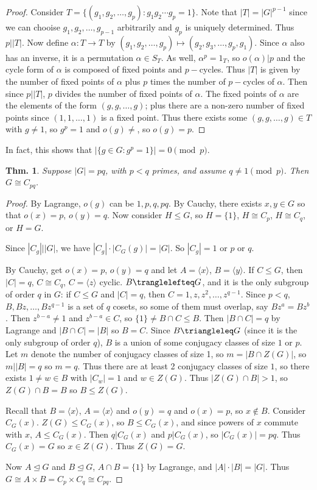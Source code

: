 \documentclass[12pt, a4paper]{book}
\newtheorem{theorem}{Thm.}[section]
\theoremstyle{nonumberplain}
\newtheorem{proof}{Proof}
\begin{document}
\begin{proof}
    Consider $T=\{(g_1,g_2,\ldots,g_p):g_1g_2\cdots g_p=1\}$.
    Note that $|T|=|G|^{p-1}$ since we can chooise $g_1,g_2,\ldots,g_{p-1}$ arbitrarily and $g_p$ is uniquely determined.
    Thus $p||T|$.
    Now define $\alpha:T\to T$ by $(g_1,g_2,\ldots,g_p)\mapsto(g_2,g_3,\ldots,g_p,g_1)$.
    Since $\alpha$ also has an inverse, it is a permutation $\alpha\in S_T$.
    As well, $\alpha^p=1_T$, so $o(\alpha)|p$ and the cycle form of $\alpha$ is composed of fixed points and $p-$cycles.
    Thus $|T|$ is given by the number of fixed points of $\alpha$ plus $p$ times the number of $p-$cycles of $\alpha$.
    Then since $p||T|$, $p$ divides the number of fixed points of $\alpha$.
    The fixed points of $\alpha$ are the elements of the form $(g,g,\ldots,g)$; plus there are a non-zero number of fixed points since $(1,1,\ldots,1)$ is a fixed point.
    Thus there exists some $(g,g,\ldots,g)\in T$ with $g\neq 1$, so $g^p=1$ and $o(g)\neq $, so $o(g)=p$.
\end{proof}
In fact, this shows that $|\{g\in G:g^p=1\}|=0\pmod{p}$.
\begin{theorem}
    Suppose $|G|=pq$, with $p<q$ primes, and assume $q\neq 1\pmod{p}$.
    Then $G\cong C_{pq}$.
\end{theorem}
\begin{proof}
    By Lagrange, $o(g)$ can be $1,p,q,pq$.
    By Cauchy, there exists $x,y\in G$ so that $o(x)=p$, $o(y)=q$.
    Now consider $H\leq G$, so $H=\{1\}$, $H\cong C_p$, $H\cong C_q$, or $H=G$.

    Since $|C_g|||G|$, we have $|C_g|\cdot|C_G(g)|=|G|$.
    So $|C_g|=1$ or $p$ or $q$.

    By Cauchy, get $o(x)=p$, $o(y)=q$ and let $A=\langle x\rangle$, $B=\langle y\rangle$.
    If $C\leq G$, then $|C|=q$, $C\cong C_q$, $C=\langle z\rangle$ cyclic.
    $B\tranglelefteq G$, and it is the only subgroup of order $q$ in $G$: if $C\leq G$ and $|C|=q$, then $C=1,z,z^2,\ldots,z^{q-1}$.
    Since $p<q$, $B,Bz,\ldots,Bz^{q-1}$ is a set of $q$ cosets, so some of them must overlap, say $Bz^a=Bz^b$.
    Then $z^{b-a}\neq 1$ and $z^{b-a}\in C$, so $\{1\}\neq B\cap C\leq B$.
    Then $|B\cap C|=q$ by Lagrange and $|B\cap C|=|B|$ so $B=C$.
    Since $B\triangleleq G$ (since it is the only subgroup of order $q$), $B$ is a union of some conjugacy classes of size $1$ or $p$.
    Let $m$ denote the number of conjugacy classes of size 1, so $m=|B\cap Z(G)|$, so $m||B|=q$ so $m=q$.
    Thus there are at least 2 conjugacy classes of size $1$, so there exists $1\neq w\in B$ with $|C_w|=1$ and $w\in Z(G)$.
    Thus $|Z(G)\cap B|>1$, so $Z(G)\cap B=B$ so $B\leq Z(G)$.

    Recall that $B=\langle x\rangle$, $A=\langle x\rangle$ and $o(y)=q$ and $o(x)=p$, so $x\notin B$.
    Consider $C_G(x)$.
    $Z(G)\leq C_G(x)$, so $B\leq C_G(x)$, and since powers of $x$ commute with $x$, $A\leq C_G(x)$.
    Then $q|C_G(x)$ and $p|C_G(x)$, so $|C_G(x)|=pq$.
    Thus $C_G(x)=G$ so $x\in Z(G)$.
    Thus $Z(G)=G$.

    Now $A\trianglelefteq G$ and $B\trianglelefteq G$, $A\cap B=\{1\}$ by Lagrange, and $|A|\cdot|B|=|G|$.
    Thus $G\cong A\times B=C_p\times C_q\cong C_{pq}$.
\end{proof}
\end{document}
